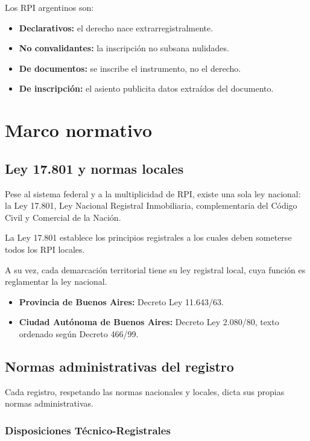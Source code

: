 \documentclass[12pt]{book}
\begin{document}
Los RPI argentinos son:

\begin{itemize}
    \item \textbf{Declarativos:} el derecho nace extrarregistralmente.
    \item \textbf{No convalidantes:} la inscripci\'on no subsana nulidades.
    \item \textbf{De documentos:} se inscribe el instrumento, no el derecho.
    \item \textbf{De inscripci\'on:} el asiento publicita datos extra\'idos del documento.
\end{itemize}

\chapter{Marco normativo}

\section{Ley 17.801 y normas locales}

Pese al sistema federal y a la multiplicidad de RPI, existe una sola ley nacional: la Ley 17.801, Ley Nacional Registral Inmobiliaria, complementaria del C\'odigo Civil y Comercial de la Naci\'on.

La Ley 17.801 establece los principios registrales a los cuales deben someterse todos los RPI locales.

A su vez, cada demarcaci\'on territorial tiene su ley registral local, cuya funci\'on es reglamentar la ley nacional.

\begin{itemize}
    \item \textbf{Provincia de Buenos Aires:} Decreto Ley 11.643/63.
    \item \textbf{Ciudad Aut\'onoma de Buenos Aires:} Decreto Ley 2.080/80, texto ordenado seg\'un Decreto 466/99.
\end{itemize}

\section{Normas administrativas del registro}

Cada registro, respetando las normas nacionales y locales, dicta sus propias normas administrativas.

\subsection{Disposiciones T\'ecnico-Registrales}
\end{document}
